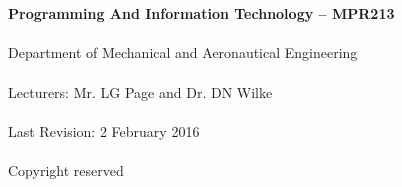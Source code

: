 \begin{titlepage}
    \thispagestyle{empty}
    \\~\\[18cm]
    \large
    \textbf{Programming And Information Technology -- MPR213} \\~\\
    Department of Mechanical and Aeronautical Engineering \\~\\[0.5cm]
    \normalsize
    Lecturers: Mr. LG Page and  Dr. DN Wilke \\~\\
    Last Revision: 2 February 2016 \\~\\[0.5em]
    \textcopyright \quad Copyright reserved \\~\\
\end{titlepage}
\restoregeometry
